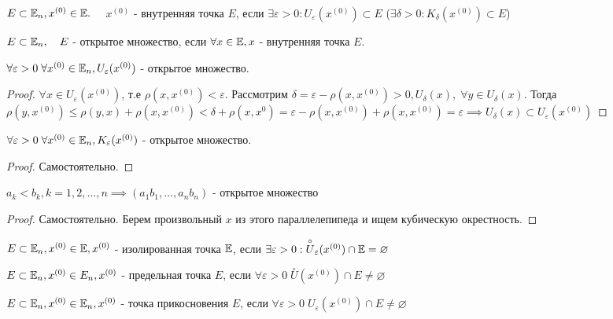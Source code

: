 \documentclass[../main.tex]{subfiles}
\begin{document}
\begin{definition}
    $E \subset \mathbb{E}_{n}, x^{(0)}\in \mathbb{E}.$ $\quad x^{(0)}$ - внутренняя точка $E$, если $\exists \varepsilon>0 : U_{\varepsilon}(x^{(0)})\subset E$ ($\exists \delta>0: K_{\delta}(x^{(0)})\subset E$)
 \end{definition}
\begin{definition}
    $E \subset \mathbb{E}_{n}, \quad E$ - открытое множество, если $\forall x \in \mathbb{E}, x $ - внутренняя точка $E$.
\end{definition}

\begin{lemma}
    $\forall \varepsilon>0 \; \forall x^{(0)}\in \mathbb{E}_{n}, U_{\varepsilon}(x^{(0)})$ - открытое множество. 
\end{lemma}
\begin{proof}
    $\forall x \in U_{\varepsilon}(x^{(0)})$, т.е $\rho(x,x^{(0)})<\varepsilon.$ Рассмотрим $\delta = \varepsilon - \rho(x,x^{(0)})>0,U_{\delta}(x),\; \forall y\in U_{\delta}(x)$. Тогда $\rho(y,x^{(0)})\leqslant \rho(y,x) + \rho(x,x^{(0)})< \delta + \rho(x,x^{0})=\varepsilon - \rho(x,x^{(0)})+\rho(x,x^{(0)}) = \varepsilon\implies U_{\delta}(x) \subset U_{\varepsilon}(x^{(0)})$ 
\end{proof}
\begin{lemma}
    $\forall \varepsilon>0 \; \forall x^{(0)}\in \mathbb{E}_{n}, K_{\varepsilon}(x^{(0)})$ - открытое множество. 
\end{lemma}
\begin{proof}
    Самостоятельно.
\end{proof}
\begin{lemma}
    $a_{k}< b_{k}, k=1,2,\dots,n\implies (a_{1}b_{1},\dots,a_{n}b_{n})$ - открытое множество
\end{lemma}
\begin{proof}
    Самостоятельно. Берем произвольный $x$ из этого параллелепипеда и ищем кубическую окрестность.
\end{proof}
\begin{definition}
    $E \subset \mathbb{E}_{n}, x^{(0)}\in \mathbb{E}, x^{(0)}$ - изолированная точка $\mathbb{E}$, если $\exists \varepsilon>0 : \overset{\circ}{U}_{\varepsilon}(x^{(0)}) \cap \mathbb{E} = \varnothing$
\end{definition}

\begin{definition}
    $E \subset \mathbb{E}_{n}, x^{(0)} \in E_{n}, x^{(0)}$ - предельная точка $E$, если $\forall \varepsilon>0 \;\overset{\circ}{U}(x^{(0)})\cap E\neq \varnothing$
\end{definition}
\begin{definition}
    $E \subset \mathbb{E}_{n},x^{(0)} \in \mathbb{E}_{n}, x^{(0)}$ - точка прикосновения $E$, если $\forall \varepsilon>0\; U_{\varepsilon}(x^{(0)})\cap E \neq  \varnothing$
\end{definition}
\end{document}
